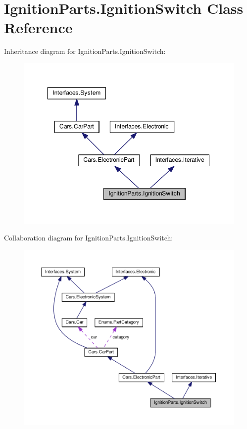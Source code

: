 \hypertarget{classIgnitionParts_1_1IgnitionSwitch}{}\section{Ignition\+Parts.\+Ignition\+Switch Class Reference}
\label{classIgnitionParts_1_1IgnitionSwitch}


Inheritance diagram for Ignition\+Parts.\+Ignition\+Switch\+:\nopagebreak
\begin{figure}[H]
\begin{center}
\leavevmode
\includegraphics[width=350pt]{classIgnitionParts_1_1IgnitionSwitch__inherit__graph}
\end{center}
\end{figure}


Collaboration diagram for Ignition\+Parts.\+Ignition\+Switch\+:\nopagebreak
\begin{figure}[H]
\begin{center}
\leavevmode
\includegraphics[width=350pt]{classIgnitionParts_1_1IgnitionSwitch__coll__graph}
\end{center}
\end{figure}
